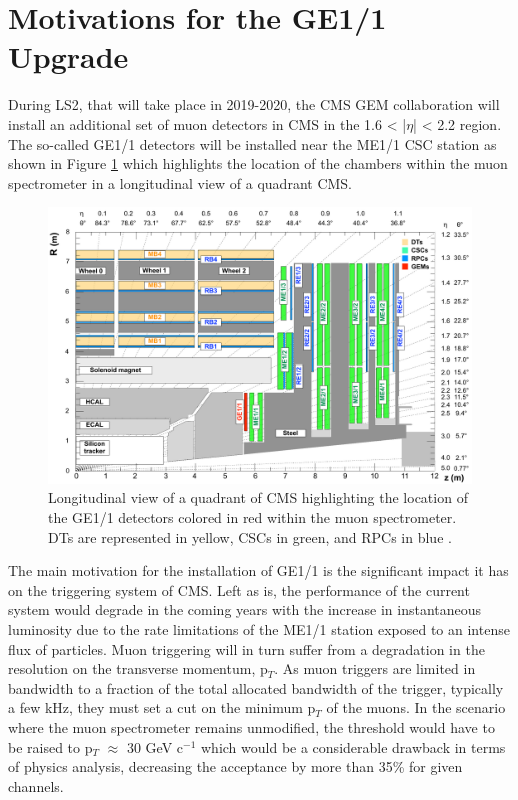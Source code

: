   \section{Motivations for the GE1/1 Upgrade}

    During LS2, that will take place in 2019-2020, the CMS GEM collaboration \cite{Colaleo:2021453} will install an additional set of muon detectors in CMS in the 1.6 < |$\eta$| < 2.2 region. The so-called GE1/1 detectors will be installed near the ME1/1 CSC station as shown in Figure \ref{fig:II-1-ge11} which highlights the location of the chambers within the muon spectrometer in a longitudinal view of a quadrant CMS. \\

    \begin{figure}[h!]
      \centering
      \includegraphics[width=\textwidth]{img/II-1-gem/ge11-quadrant.pdf}
      \caption{Longitudinal view of a quadrant of CMS highlighting the location of the GE1/1 detectors colored in red within the muon spectrometer. DTs are represented in yellow, CSCs in green, and RPCs in blue \cite{Colaleo:2021453}.}
      \label{fig:II-1-ge11}
    \end{figure}

    The main motivation for the installation of GE1/1 is the significant impact it has on the triggering system of CMS. Left as is, the performance of the current system would degrade in the coming years with the increase in instantaneous luminosity due to the rate limitations of the ME1/1 station exposed to an intense flux of particles. Muon triggering will in turn suffer from a degradation in the resolution on the transverse momentum, p$_T$. As muon triggers are limited in bandwidth to a fraction of the total allocated bandwidth of the trigger, typically a few kHz, they must set a cut on the minimum p$_T$ of the muons. In the scenario where the muon spectrometer remains unmodified, the threshold would have to be raised to p$_T$ $ \approx $ 30 GeV c$^{-1}$ which would be a considerable drawback in terms of physics analysis, decreasing the acceptance by more than 35\% for given channels. \\

